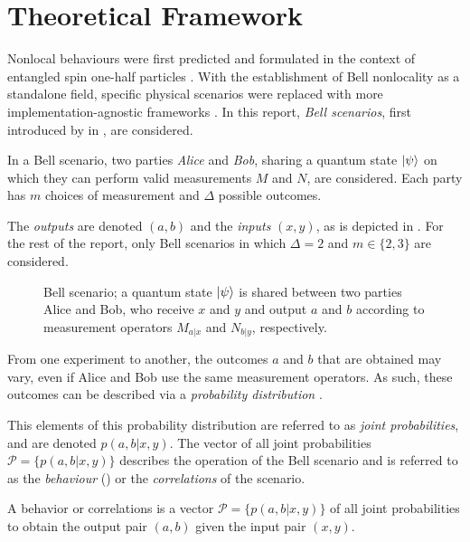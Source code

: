 \section{Theoretical Framework}
\label{seq:theoretical-framework}

Nonlocal behaviours were first predicted and formulated in the context of entangled spin one-half particles \cite{epr}. 
With the establishment of Bell nonlocality as a standalone field, specific physical scenarios were replaced with more implementation-agnostic frameworks \cite{brunner}.
In this report, \emph{Bell scenarios}, first introduced by \citeauthor{bell_einstein_1964} in \citeyear{bell_einstein_1964} \cite{bell_einstein_1964}, are considered.

In a Bell scenario, two parties \emph{Alice} and \emph{Bob}, sharing
a quantum state $\ket{\psi}$ on which they can perform valid measurements $M$ and $N$, are considered. Each party has $m$ choices
of measurement and $\Delta$ possible outcomes. 

The \emph{outputs} are denoted
$(a,b)$ and the \emph{inputs} $(x,y)$, as
is depicted in . For the rest of the report, only Bell scenarios in which $\Delta = 2$ and $m \in \{2 ,3\}$ are considered.

\begin{figure}[h!]
  \centering
  
  \caption{Bell scenario; a quantum state $\ket{\psi}$ is shared between two parties Alice and Bob, who receive $x$ and $y$ and output $a$ and $b$ according to measurement operators $M_{a | x}$ and $N_{b | y}$, respectively.}
  \label{fig:bell_scenario}
\end{figure}

From one experiment to another, the outcomes $a$ and $b$ that are obtained may vary, 
even if Alice and Bob use the same measurement operators. As such, these outcomes can
be described via a \emph{probability distribution} \cite{brunner}. 

This elements of this probability distribution are referred to as \emph{joint probabilities}, and are denoted $p(a,b|x,y)$. The vector of all joint probabilities $\mathcal{P} = \{p(a,b|x,y)\}$ describes the operation of the Bell scenario and is referred to as the \emph{behaviour} () or the \emph{correlations} of the scenario.

\begin{definition}
\label{def:behaviour}
A behavior or correlations is a
vector $\mathcal{P} = \{p(a,b|x,y)\}$ of all joint probabilities to obtain the output
pair $(a,b)$ given the input pair $(x,y)$. 
\end{definition} 

